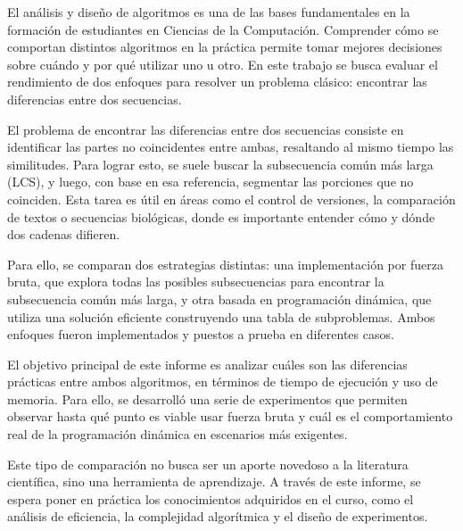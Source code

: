 El an\'alisis y dise\~no de algoritmos es una de las bases fundamentales en la formaci\'on de estudiantes en Ciencias de la Computaci\'on. Comprender c\'omo se comportan distintos algoritmos en la pr\'actica permite tomar mejores decisiones sobre cu\'ando y por qu\'e utilizar uno u otro. En este trabajo se busca evaluar el rendimiento de dos enfoques para resolver un problema cl\'asico: encontrar las diferencias entre dos secuencias.

El problema de encontrar las diferencias entre dos secuencias consiste en identificar las partes no coincidentes entre ambas, resaltando al mismo tiempo las similitudes. Para lograr esto, se suele buscar la subsecuencia común más larga (LCS), y luego, con base en esa referencia, segmentar las porciones que no coinciden. Esta tarea es útil en áreas como el control de versiones, la comparación de textos o secuencias biológicas, donde es importante entender cómo y dónde dos cadenas difieren.

Para ello, se comparan dos estrategias distintas: una implementaci\'on por fuerza bruta, que explora todas las posibles subsecuencias para encontrar la subsecuencia com\'un m\'as larga, y otra basada en programaci\'on din\'amica, que utiliza una soluci\'on eficiente construyendo una tabla de subproblemas. Ambos enfoques fueron implementados y puestos a prueba en diferentes casos.

El objetivo principal de este informe es analizar cu\'ales son las diferencias pr\'acticas entre ambos algoritmos, en t\'erminos de tiempo de ejecuci\'on y uso de memoria. Para ello, se desarroll\'o una serie de experimentos que permiten observar hasta qu\'e punto es viable usar fuerza bruta y cu\'al es el comportamiento real de la programaci\'on din\'amica en escenarios m\'as exigentes.

Este tipo de comparaci\'on no busca ser un aporte novedoso a la literatura cient\'ifica, sino una herramienta de aprendizaje. A trav\'es de este informe, se espera poner en pr\'actica los conocimientos adquiridos en el curso, como el an\'alisis de eficiencia, la complejidad algor\'itmica y el dise\~no de experimentos.


